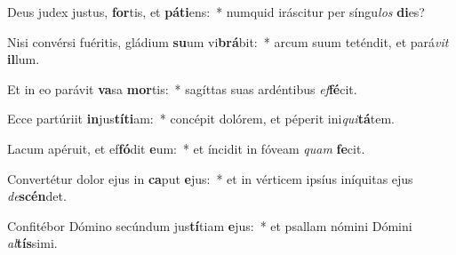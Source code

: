 \item Deus judex justus, \textbf{for}tis, et \textbf{pá}\textbf{ti}ens:~* numquid iráscitur per síngu\textit{los} \textbf{di}es?
\item Nisi convérsi fuéritis, gládium \textbf{su}um vi\textbf{brá}bit:~* arcum suum teténdit, et pará\textit{vit} \textbf{il}lum.
\item Et in eo parávit \textbf{va}sa \textbf{mor}tis:~* sagíttas suas ardéntibus \textit{ef}\textbf{fé}cit.
\item Ecce partúriit \textbf{in}jus\textbf{tí}\textbf{ti}am:~* concépit dolórem, et péperit ini\textit{qui}\textbf{tá}tem.
\item Lacum apéruit, et ef\textbf{fó}dit \textbf{e}um:~* et íncidit in fóveam \textit{quam} \textbf{fe}cit.
\item Convertétur dolor ejus in \textbf{ca}put \textbf{e}jus:~* et in vérticem ipsíus iníquitas ejus \textit{de}\textbf{scén}det.
\item Confitébor Dómino secúndum jus\textbf{tí}tiam \textbf{e}jus:~* et psallam nómini Dómini \textit{al}\textbf{tís}simi.
